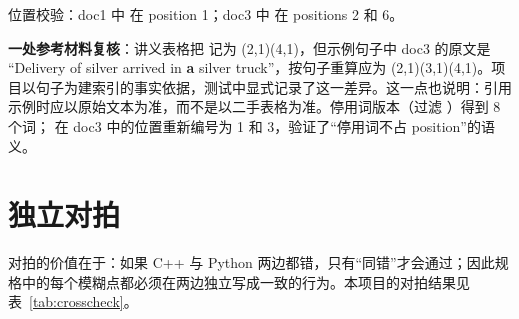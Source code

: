 位置校验：doc1 中  在 position 1；doc3 中  在 positions 2 和 6。

\textbf{一处参考材料复核}：讲义表格把  记为 (2,1)(4,1)，但示例句子中 doc3 的原文是 “Delivery of silver arrived in \textbf{a} silver truck”，按句子重算应为 (2,1)(3,1)(4,1)。项目以句子为建索引的事实依据，测试中显式记录了这一差异。这一点也说明：引用示例时应以原始文本为准，而不是以二手表格为准。停用词版本（过滤 ）得到 8 个词； 在 doc3 中的位置重新编号为 1 和 3，验证了“停用词不占 position”的语义。

\section{独立对拍}

对拍的价值在于：如果 C++ 与 Python 两边都错，只有“同错”才会通过；因此规格中的每个模糊点都必须在两边独立写成一致的行为。本项目的对拍结果见表~\ref{tab:crosscheck}。

